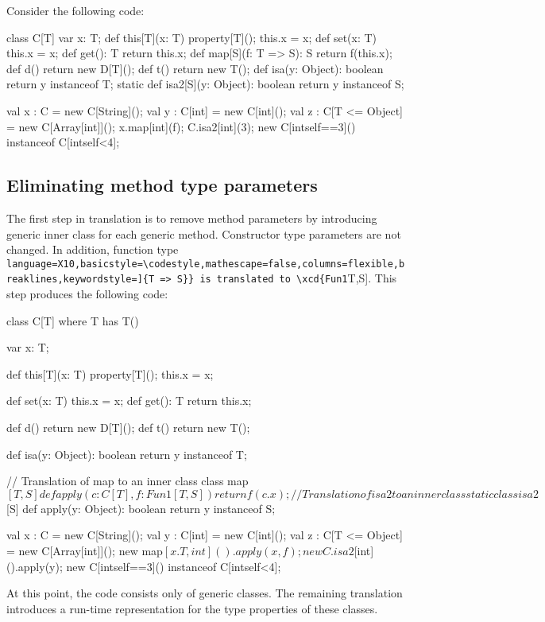 \documentclass{llncs}
\newcommand\codestyle\tt
\newcommand{\xcd}[1]{{\lstinline[language=X10,basicstyle=\codestyle,mathescape=false,columns=flexible,breaklines,keywordstyle=]{#1}}}
\newcommand{\xcd}[1]{{\tt #1}}
\begin{document}
Consider the following code:
\begin{displayxten}
class C[T] {
    var x: T;
    def this[T](x: T) { property[T](); this.x = x; }
    def set(x: T) { this.x = x; }
    def get(): T { return this.x; }
    def map[S](f: T => S): S { return f(this.x); }
    def d() { return new D[T](); }
    def t() { return new T(); }
    def isa(y: Object): boolean { return y instanceof T; }
    static def isa2[S](y: Object): boolean { return y instanceof S; }
}

val x : C = new C[String]();
val y : C[int] = new C[int]();
val z : C[T <= Object] = new C[Array[int]]();
x.map[int](f);
C.isa2[int](3);
new C[int{self==3}]() instanceof C[int{self<4}];
\end{displayxten}

\subsection{Eliminating method type parameters}

The first step in translation is to remove method parameters by
introducing generic inner class for each generic method.
Constructor type parameters are not changed.
In addition, function type \xcd{T => S} is translated to \xcd{Fun1[T,S]}.
This step produces the following code:
\begin{displayxten}
class C[T] where T has T() {
    var x: T;

    def this[T](x: T) { property[T](); this.x = x; }

    def set(x: T) { this.x = x; }
    def get(): T { return this.x; }

    def d() { return new D[T](); }
    def t() { return new T(); }

    def isa(y: Object): boolean { return y instanceof T; }

    // Translation of map to an inner class
    class map$[T,S] {
        def apply(c: C[T], f: Fun1[T,S]) { return f(c.x); }
    }

    // Translation of isa2 to an inner class
    static class isa2$[S] {
        def apply(y: Object): boolean { return y instanceof S; }
    }
}

val x : C = new C[String]();
val y : C[int] = new C[int]();
val z : C[T <= Object] = new C[Array[int]]();
new map$[x.T,int]().apply(x,f);
new C.isa2$[int]().apply(y);
new C[int{self==3}]() instanceof C[int{self<4}];
\end{displayxten}
At this point, the code consists only of generic classes.
The remaining translation introduces a run-time representation
for the type properties of these classes.
\end{document}
